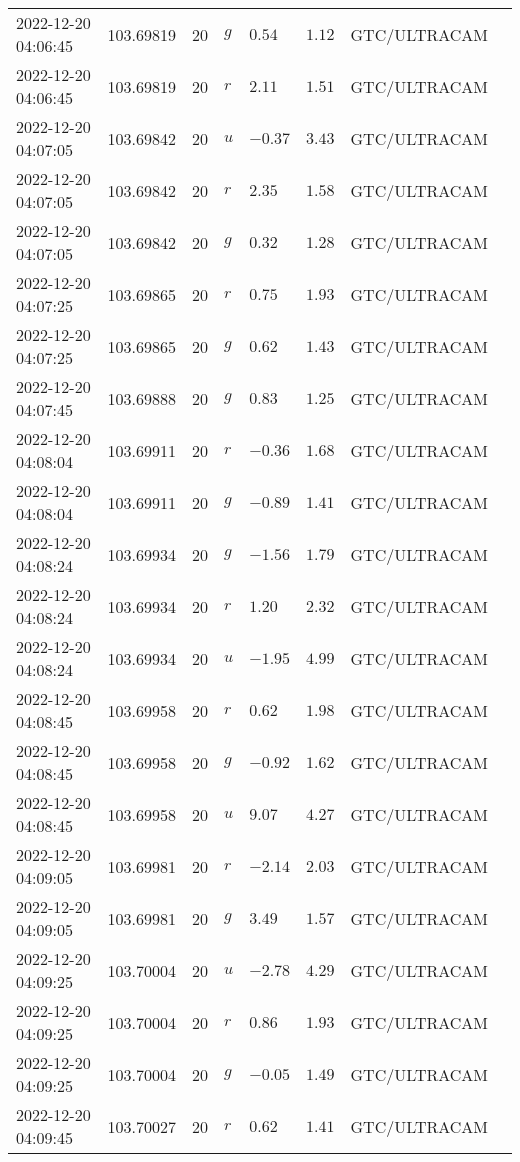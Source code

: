\documentclass{nature_plusfigure}
\begin{document}
\begin{supplement}
\begin{center}
\begin{longtable}{llllllll}
2022-12-20 04:06:45 & 103.69819 & 20 & $g$ & $0.54$ & $1.12$ & GTC/ULTRACAM &  \\ 
2022-12-20 04:06:45 & 103.69819 & 20 & $r$ & $2.11$ & $1.51$ & GTC/ULTRACAM &  \\ 
2022-12-20 04:07:05 & 103.69842 & 20 & $u$ & $-0.37$ & $3.43$ & GTC/ULTRACAM &  \\ 
2022-12-20 04:07:05 & 103.69842 & 20 & $r$ & $2.35$ & $1.58$ & GTC/ULTRACAM &  \\ 
2022-12-20 04:07:05 & 103.69842 & 20 & $g$ & $0.32$ & $1.28$ & GTC/ULTRACAM &  \\ 
2022-12-20 04:07:25 & 103.69865 & 20 & $r$ & $0.75$ & $1.93$ & GTC/ULTRACAM &  \\ 
2022-12-20 04:07:25 & 103.69865 & 20 & $g$ & $0.62$ & $1.43$ & GTC/ULTRACAM &  \\ 
2022-12-20 04:07:45 & 103.69888 & 20 & $g$ & $0.83$ & $1.25$ & GTC/ULTRACAM &  \\ 
2022-12-20 04:08:04 & 103.69911 & 20 & $r$ & $-0.36$ & $1.68$ & GTC/ULTRACAM &  \\ 
2022-12-20 04:08:04 & 103.69911 & 20 & $g$ & $-0.89$ & $1.41$ & GTC/ULTRACAM &  \\ 
2022-12-20 04:08:24 & 103.69934 & 20 & $g$ & $-1.56$ & $1.79$ & GTC/ULTRACAM &  \\ 
2022-12-20 04:08:24 & 103.69934 & 20 & $r$ & $1.20$ & $2.32$ & GTC/ULTRACAM &  \\ 
2022-12-20 04:08:24 & 103.69934 & 20 & $u$ & $-1.95$ & $4.99$ & GTC/ULTRACAM &  \\ 
2022-12-20 04:08:45 & 103.69958 & 20 & $r$ & $0.62$ & $1.98$ & GTC/ULTRACAM &  \\ 
2022-12-20 04:08:45 & 103.69958 & 20 & $g$ & $-0.92$ & $1.62$ & GTC/ULTRACAM &  \\ 
2022-12-20 04:08:45 & 103.69958 & 20 & $u$ & $9.07$ & $4.27$ & GTC/ULTRACAM &  \\ 
2022-12-20 04:09:05 & 103.69981 & 20 & $r$ & $-2.14$ & $2.03$ & GTC/ULTRACAM &  \\ 
2022-12-20 04:09:05 & 103.69981 & 20 & $g$ & $3.49$ & $1.57$ & GTC/ULTRACAM &  \\ 
2022-12-20 04:09:25 & 103.70004 & 20 & $u$ & $-2.78$ & $4.29$ & GTC/ULTRACAM &  \\ 
2022-12-20 04:09:25 & 103.70004 & 20 & $r$ & $0.86$ & $1.93$ & GTC/ULTRACAM &  \\ 
2022-12-20 04:09:25 & 103.70004 & 20 & $g$ & $-0.05$ & $1.49$ & GTC/ULTRACAM &  \\ 
2022-12-20 04:09:45 & 103.70027 & 20 & $r$ & $0.62$ & $1.41$ & GTC/ULTRACAM &  \\ 

\end{longtable}
\end{center}
\end{supplement}
\end{document}

